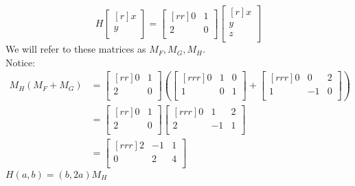 \documentclass{report}
\theoremstyle{plain}
\theoremstyle{definition}
\theoremstyle{plain}
\begin{document}
\[ H\begin{bmatrix}[r]x\\y\\\end{bmatrix}=\begin{bmatrix}[rr]0&1\\2&0\\\end{bmatrix}\begin{bmatrix}[r]x\\y\\z\\\end{bmatrix}\]
We will refer to these matrices as $M_F, M_G, M_H$.\\
Notice:
\begin{align*}
M_H(M_F+M_G) &= \begin{bmatrix}[rr]0&1\\2&0\\\end{bmatrix}\left(\begin{bmatrix}[rrr]0&1&0\\1&0&1\\\end{bmatrix}+\begin{bmatrix}[rrr]0&0&2\\1&-1&0\\\end{bmatrix}\right )\\
&= \begin{bmatrix}[rr]0&1\\2&0\\\end{bmatrix}\begin{bmatrix}[rrr]0&1&2\\2&-1&1\\\end{bmatrix}\\
&=\begin{bmatrix}[rrr]2&-1&1\\0&2&4\\\end{bmatrix}
\end{align*}
$H(a,b)=(b,2a)M_H$
\end{document}
